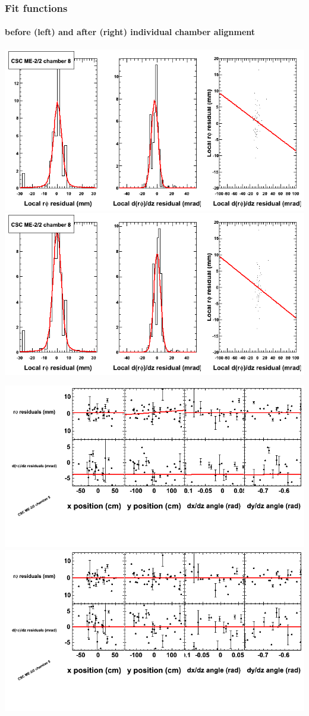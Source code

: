 \documentclass[compress]{beamer}
\begin{document}
\begin{frame}
\frametitle{Fit functions}
\framesubtitle{before (left) and after (right) individual chamber alignment}
\includegraphics[width=0.5\linewidth]{ringfits_3dof/beforefit_MEm22_08_bellcurve.png} \includegraphics[width=0.5\linewidth]{ringfits_3dof/afterfit_MEm22_08_bellcurve.png}

\includegraphics[width=0.5\linewidth]{ringfits_3dof/beforefit_MEm22_08_polynomials.png} \includegraphics[width=0.5\linewidth]{ringfits_3dof/afterfit_MEm22_08_polynomials.png}
\end{frame}
\end{document}
